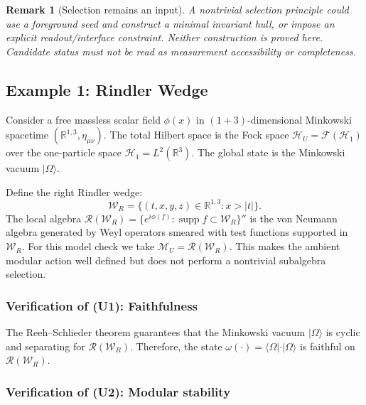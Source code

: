 \documentclass[12pt,a4paper,openany]{book}
\newtheorem{remark}[theorem]{Remark}
\begin{document}
\begin{remark}[Selection remains an input]
A nontrivial selection principle could use a foreground seed and construct a minimal invariant hull, or impose an explicit readout/interface constraint.  Neither construction is proved here.  Candidate status must not be read as measurement accessibility or completeness.
\end{remark}


\subsection{Example 1: Rindler Wedge}
\label{H-D-sec:rindler}

Consider a free massless scalar field $\phi(x)$ in $(1+3)$-dimensional Minkowski spacetime $(\mathbb{R}^{1,3}, \eta_{\mu\nu})$.
The total Hilbert space is the Fock space $\mathcal{H}_U = \mathcal{F}(\mathcal{H}_1)$ over the one-particle space $\mathcal{H}_1 = L^2(\mathbb{R}^3)$.
The global state is the Minkowski vacuum $|\Omega\rangle$.

Define the right Rindler wedge:
\begin{equation}
\mathcal{W}_R = \{(t, x, y, z) \in \mathbb{R}^{1,3} : x > |t|\}.
\end{equation}
The local algebra $\mathcal{R}(\mathcal{W}_R) = \{e^{i\phi(f)} : \operatorname{supp} f \subset \mathcal{W}_R\}''$ is the von Neumann algebra generated by Weyl operators smeared with test functions supported in $\mathcal{W}_R$.
For this model check we take $\mathcal M_U=\mathcal R(\mathcal W_R)$.  This makes the ambient modular action well defined but does not perform a nontrivial subalgebra selection.

\subsubsection{Verification of (U1): Faithfulness}

The Reeh--Schlieder theorem \cite{Haag1996} guarantees that the Minkowski vacuum $|\Omega\rangle$ is cyclic and separating for $\mathcal{R}(\mathcal{W}_R)$.
Therefore, the state $\omega(\cdot) = \langle\Omega|\cdot|\Omega\rangle$ is faithful on $\mathcal{R}(\mathcal{W}_R)$.

\subsubsection{Verification of (U2): Modular stability}
\end{document}
